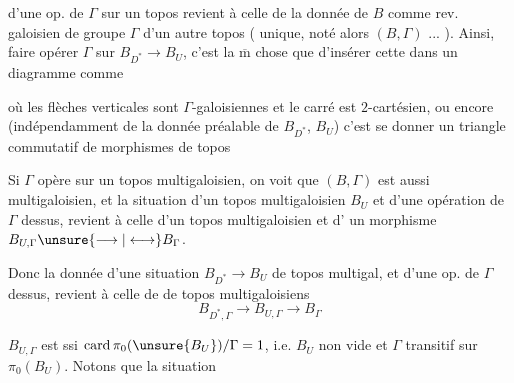 
 d'une op. de $\Gamma$ sur un topos  revient
à celle de la donnée de $B$ comme
rev. galoisien de groupe $\Gamma$ d'un
autre topos ( unique, noté alors
$(B,\Gamma)$ ... ). Ainsi, faire opérer
 $\Gamma$ sur $B_{D^*}\longrightarrow B_U$, c'est
la $\overline{\mathrm m}$ chose que d'insérer cette
  dans un diagramme comme


 où les flèches verticales sont $\Gamma$-galoisiennes
et le carré est $2$-cartésien, ou encore
(indépendamment de la donnée préalable
de $B_{D^*}$, $B_U$) c'est se donner un
triangle  commutatif de morphismes
de topos



Si $\Gamma$ opère sur un topos multigaloisien,
on voit que $(B,\Gamma)$ est aussi
multigaloisien, et la situation d'un
topos multigaloisien $B_U$ et d'une
opération de $\Gamma$ dessus, revient à celle
d'un topos multigaloisien  et d'
un morphisme $B_{U,\Gamma}\unsure{\longrightarrow|\longleftrightarrow}B_\Gamma$.

Donc la donnée d'une situation
$B_{D^*}\longrightarrow B_U$ de topos multigal,
et d'une op. de $\Gamma$ dessus,
revient  à celle de 
de topos multigaloisiens
\[
 B_{D^*,\Gamma}\longrightarrow B_{U,\Gamma}\longrightarrow B_\Gamma
\]

$B_{U,\Gamma}$ est  ssi $\operatorname{card}\pi_0(\unsure{B_U})/\Gamma=1$,
i.e. $B_U$ non vide et $\Gamma$ transitif sur
$\pi_0(B_U)$. Notons que la situation

